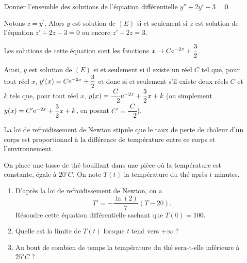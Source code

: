 \documentclass[11pt,fleqn, openany]{book} %
\begin{document}
 

\begin{exercise}Donner l'ensemble des solutions de l'équation différentielle $y''+2y'-3=0$.\end{exercise}

\begin{solution}
Notons \(z=y^{\prime}\). Alors \(y\) est solution de \((E)\) si et seulement si \(z\) est solution de l'équation \(z'+2z-3=0\) ou encore \(z'+2z=3\).

Les solutions de cette équation sont les fonctions \(x\mapsto C\mathrm{e}^{-2x}+\dfrac{3}{2}\). 

Ainsi, \(y\) est solution de \((E)\) si et seulement si il existe un réel \(C\) tel que, pour tout réel \(x\), \(y'(x)=C\mathrm{e}^{-2x}+\dfrac{3}{2}\) et donc si et seulement s'il existe deux réels \(C\) et \(k\) tels que, pour tout réel \(x\), \(y(x)=\dfrac{C}{-2}\mathrm{e}^{-2x}+\dfrac{3}{2}x+k\) (ou simplement \(y(x)=C'\mathrm{e}^{-2x}+\dfrac{3}{2}x+k\), en posant \(C'=\dfrac{C}{-2}\)).

 \end{solution}
 
 

\begin{exercise}[subtitle={(Loi de refroidissement de Newton)}] La loi de refroidissement de Newton stipule que le taux de perte de chaleur d'un corps est proportionnel à la différence de température entre ce corps et l'environnement. 

On place une tasse de thé bouillant dans une pièce où la température est constante, égale à $20^{\circ}C$. On note $T(t)$ la température du thé après $t$ minutes.
\begin{enumerate}
\item D'après la loi de refroidissement de Newton, on a
\[T'=-\dfrac{\ln(2)}{7}(T-20).\]
Résoudre cette équation différentielle sachant que $T(0)=100$.
\item Quelle est la limite de $T(t)$ lorsque $t$ tend vers $+\infty$ ?
\item Au bout de combien de temps la température du thé sera-t-elle inférieure à $25^{\circ}C$ ?
\end{enumerate} \end{exercise}
\end{document}
